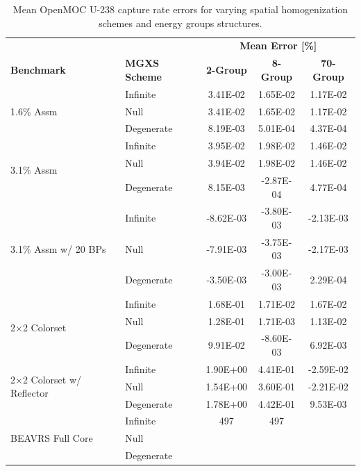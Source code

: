 \begin{table}[h!]
  \centering
  \caption[Mean OpenMOC U-238 capture rate errors]{Mean OpenMOC U-238 capture rate errors for varying spatial homogenization schemes and energy groups structures.}
  \small
  \label{table:chap8-openmoc-mean-capt-rates}
  \vspace{6pt}
  \begin{tabular}{l l c c c}
  \toprule
  \rowcolor{lightgray}
  & & \multicolumn{3}{c}{\cellcolor{lightgray} \textbf{Mean Error [\%]}} \\
  \multirow{-2}{*}{\cellcolor{lightgray} \bf Benchmark} &
  \multirow{-2}{*}{\cellcolor{lightgray} \bf \ac{MGXS} Scheme} &
  {\cellcolor{lightgray} \bf 2-Group} &
  {\cellcolor{lightgray} \bf 8-Group} &
  {\cellcolor{lightgray} \bf 70-Group} \\
  \midrule
\multirow{3}{*}{\parbox{2.5cm}{1.6\% Assm}} & Infinite & 3.41E-02 & 1.65E-02 & 1.17E-02 \\
& Null & 3.41E-02 & 1.65E-02 & 1.17E-02 \\
& Degenerate & 8.19E-03 & 5.01E-04 & 4.37E-04 \\
  \midrule
\multirow{3}{*}{\parbox{2.5cm}{3.1\% Assm}} & Infinite & 3.95E-02 & 1.98E-02 & 1.46E-02 \\
& Null & 3.94E-02 & 1.98E-02 & 1.46E-02 \\
& Degenerate & 8.15E-03 & -2.87E-04 & 4.77E-04 \\
  \midrule
\multirow{3}{*}{\parbox{2.5cm}{3.1\% Assm w/ 20 BPs}} & Infinite & -8.62E-03 & -3.80E-03 & -2.13E-03 \\
& Null & -7.91E-03 & -3.75E-03 & -2.17E-03 \\
& Degenerate & -3.50E-03 & -3.00E-03 & 2.29E-04 \\
  \midrule
\multirow{3}{*}{\parbox{2.5cm}{2$\times$2 Colorset}} & Infinite & 1.68E-01 & 1.71E-02 & 1.67E-02 \\
& Null & 1.28E-01 & 1.71E-03 & 1.13E-02 \\
& Degenerate & 9.91E-02 & -8.60E-03 & 6.92E-03 \\
  \midrule
\multirow{3}{*}{\parbox{2.5cm}{2$\times$2 Colorset w/ Reflector}} & Infinite & 1.90E+00 & 4.41E-01 & -2.59E-02 \\
& Null & 1.54E+00 & 3.60E-01 & -2.21E-02 \\
& Degenerate & 1.78E+00 & 4.42E-01 & 9.53E-03 \\
  \midrule
  \multirow{3}{*}{\parbox{2cm}{\ac{BEAVRS} Full Core}} & Infinite & 497 & 497 & \\
  & Null & & & \\
  & Degenerate & & & \\
  \bottomrule
\end{tabular}
\end{table}


